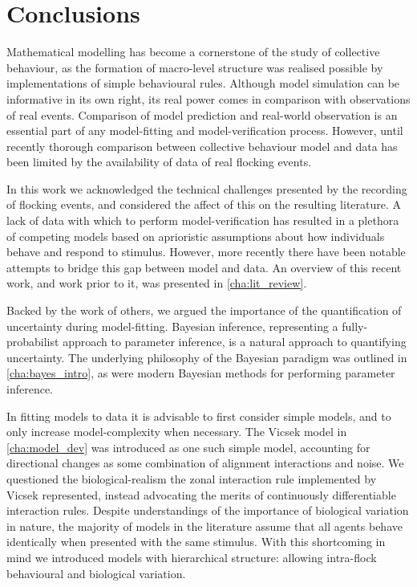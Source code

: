 \chapter*{Conclusions}
\label{cha:conc}

Mathematical modelling has become a cornerstone of the study of collective
behaviour, as the formation of macro-level structure was realised possible by
implementations of simple behavioural rules. Although model simulation can be
informative in its own right, its real power comes in comparison with
observations of real events. Comparison of model prediction and real-world
observation is an essential part of any model-fitting and model-verification
process. However, until recently thorough comparison between collective
behaviour model and data has been limited by the availability of data of real
flocking events.

In this work we acknowledged the technical challenges presented by the
recording of flocking events, and considered the affect of this on the
resulting literature. A lack of data with which to perform model-verification
has resulted in a plethora of competing models based on aprioristic assumptions
about how individuals behave and respond to stimulus. However, more recently
there have been notable attempts to bridge this gap between model and data. An
overview of this recent work, and work prior to it, was presented in
\cref{cha:lit_review}.

Backed by the work of others, we argued the importance of the quantification of
uncertainty during model-fitting. Bayesian inference, representing a
fully-probabilist approach to parameter inference, is a natural approach to
quantifying uncertainty. The underlying philosophy of the Bayesian paradigm was
outlined in \cref{cha:bayes_intro}, as were modern Bayesian methods for
performing parameter inference.

In fitting models to data it is advisable to first consider simple models, and
to only increase model-complexity when necessary. The Vicsek model in
\cref{cha:model_dev} was introduced as one such simple model, accounting for
directional changes as some combination of alignment interactions and noise. We
questioned the biological-realism the zonal interaction rule implemented by
Vicsek represented, instead advocating the merits of continuously
differentiable interaction rules. Despite understandings of the importance of
biological variation in nature, the majority of models in the literature assume
that all agents behave identically when presented with the same stimulus. With
this shortcoming in mind we introduced models with hierarchical structure:
allowing intra-flock behavioural and biological variation.


